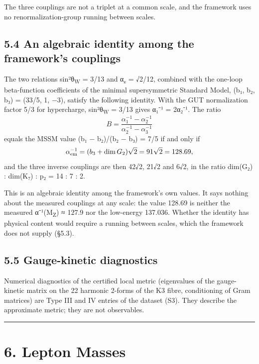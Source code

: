 \documentclass[11pt,a4paper]{article}
\begin{document}
The three couplings are not a triplet at a common scale, and the framework uses no renormalization-group running between scales.

\subsection{5.4 An algebraic identity among the framework's couplings}\label{an-algebraic-identity-among-the-frameworks-couplings}

The two relations sin²θ\textsubscript{W} = 3/13 and α\textsubscript{s} = √2/12, combined with the one-loop beta-function coefficients of the minimal supersymmetric Standard Model, (b₁, b₂, b₃) = (33/5, 1, −3), satisfy the following identity. With the GUT normalization factor 5/3 for hypercharge, sin²θ\textsubscript{W} = 3/13 gives α₁⁻¹ = 2α₂⁻¹. The ratio \[B = \frac{\alpha_1^{-1} - \alpha_2^{-1}}{\alpha_2^{-1} - \alpha_3^{-1}}\] equals the MSSM value (b₁ − b₂)/(b₂ − b₃) = 7/5 if and only if \[\alpha_{\rm em}^{-1} = (b_3 + \dim G_2)\sqrt{2} = 91\sqrt{2} = 128.69,\] and the three inverse couplings are then 42√2, 21√2 and 6√2, in the ratio dim(G₂) : dim(K₇) : p₂ = 14 : 7 : 2.

This is an algebraic identity among the framework's own values. It says nothing about the measured couplings at any scale: the value 128.69 is neither the measured α⁻¹(M\textsubscript{Z}) ≈ 127.9 nor the low-energy 137.036. Whether the identity has physical content would require a running between scales, which the framework does not supply (§5.3).

\subsection{5.5 Gauge-kinetic diagnostics}\label{gauge-kinetic-diagnostics}

Numerical diagnostics of the certified local metric (eigenvalues of the gauge-kinetic matrix on the 22 harmonic 2-forms of the K3 fibre, conditioning of Gram matrices) are Type III and IV entries of the dataset (S3). They describe the approximate metric; they are not observables.

\begin{center}\rule{\linewidth}{0.5pt}\end{center}

\section{6. Lepton Masses}\label{lepton-masses}
\end{document}
